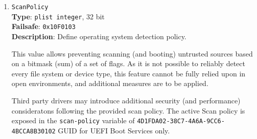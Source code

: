 \documentclass[]{article}
\begin{document}
\begin{enumerate}
\item
  \texttt{ScanPolicy}\\
  \textbf{Type}: \texttt{plist\ integer}, 32 bit\\
  \textbf{Failsafe}: \texttt{0x10F0103}\\
  \textbf{Description}: Define operating system detection policy.

  This value allows preventing scanning (and booting) untrusted
  sources based on a bitmask (sum) of a set of flags. As it is not possible
  to reliably detect every file system or device type, this feature
  cannot be fully relied upon in open environments, and additional
  measures are to be applied.

  Third party drivers may introduce additional security (and performance)
  consideratons following the provided scan policy. The active Scan policy is exposed
  in the \texttt{scan-policy} variable of \texttt{4D1FDA02-38C7-4A6A-9CC6-4BCCA8B30102}
  GUID for UEFI Boot Services only.


\end{enumerate}
\end{document}
